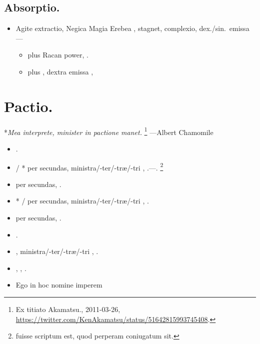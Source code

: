 \documentclass[12pt]{book}
\newcommand{\reconst}{*}
\begin{document}
\section{Absorptio.}\label{absorptio}

\begin{itemize}
  \item Agite extractio, Negica Magia Erebea , stagnet, complexio, dex./sin.\ emissa ---
  \begin{itemize}
    \item \textelp{} plus \textenglish{Racan power}, .
    \item \textelp{} plus , dextra emissa , \textelp{}
  \end{itemize}
\end{itemize}


\chapter{Pactio.}\label{pactio}

\reconst{}\emph{Mea interprete, minister  in pactione manet.}%
\footnote{%
  Ex titiato Akamatsu., 2011-03-26,
  \url{https://twitter.com/KenAkamatsu/status/51642815993745408}.
}
---Albert Chamomile

\begin{itemize}
  \item {}.
  \item {} /
        \reconst{}
        per  secundas,
        ministra/-ter/-træ/-tri , .---.%
        \footnote{
           fuisse scriptum est, quod perperam coniugatum sit.
        }
  \item {} per  secundas, .
  \item \reconst{} /
         per  secundas, ministra/-ter/-træ/-tri , .
  \item {} per  secundas, .
  \item {}.
  \item {}, ministra/-ter/-træ/-tri , .
  \item {}, , .
  \item Ego  in hoc nomine imperem \textelp{}

\end{itemize}
\end{document}
